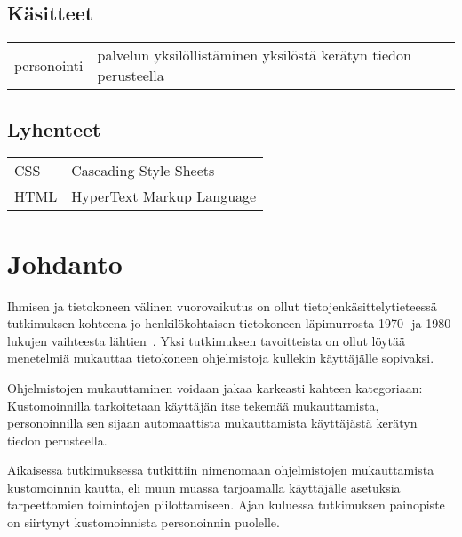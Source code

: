 \documentclass[finnish, 12pt, a4paper, elec, utf8, a-1b, online]{aaltothesis}
\date{xx.xx.2022}
\begin{document}
\makecoverpage{}

\makecopyrightpage{}

\begin{abstractpage}[finnish]
\end{abstractpage}

\thesistableofcontents{}


\subsection*{Käsitteet}

\begin{tabular}{ll}
personointi & palvelun yksilöllistäminen yksilöstä kerätyn tiedon perusteella
\end{tabular}

\subsection*{Lyhenteet}

\begin{tabular}{ll}
CSS & Cascading Style Sheets \\
HTML & HyperText Markup Language
\end{tabular}

\cleardoublepage{}

\section{Johdanto}

Ihmisen ja tietokoneen välinen vuorovaikutus on ollut tietojenkäsittelytieteessä
tutkimuksen kohteena jo henkilökohtaisen tietokoneen läpimurrosta 1970- ja
1980-lukujen vaihteesta lähtien~\cite{10.1145/800178.810088}. Yksi tutkimuksen
tavoitteista on ollut löytää menetelmiä mukauttaa tietokoneen ohjelmistoja
kullekin käyttäjälle sopivaksi.

Ohjelmistojen mukauttaminen voidaan jakaa karkeasti kahteen kategoriaan:
Kustomoinnilla tarkoitetaan käyttäjän itse tekemää mukauttamista, personoinnilla
sen sijaan automaattista mukauttamista käyttäjästä kerätyn tiedon
perusteella.~\cite{10.1108/03090560710737534}

Aikaisessa tutkimuksessa tutkittiin nimenomaan ohjelmistojen mukauttamista
kustomoinnin kautta, eli muun muassa tarjoamalla käyttäjälle asetuksia
tarpeettomien toimintojen piilottamiseen. Ajan kuluessa tutkimuksen painopiste
on siirtynyt kustomoinnista personoinnin puolelle.
\end{document}
